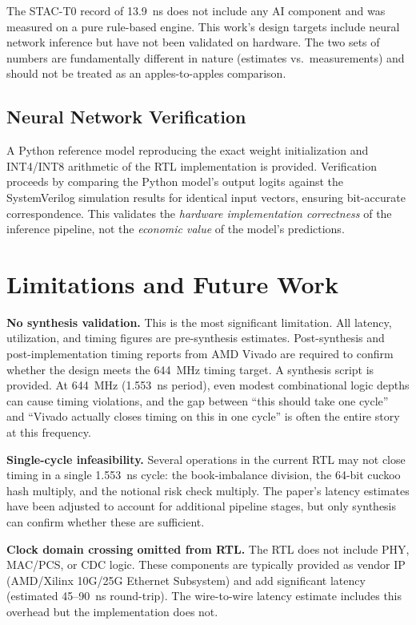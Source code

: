 \documentclass[conference,10pt]{IEEEtran}
\begin{document}
\noindent The STAC-T0 record of 13.9~ns does not include any AI component and was measured on a pure rule-based engine. This work's design targets include neural network inference but have not been validated on hardware. The two sets of numbers are fundamentally different in nature (estimates vs.\ measurements) and should not be treated as an apples-to-apples comparison.

\subsection{Neural Network Verification}

A Python reference model reproducing the exact weight initialization and INT4/INT8 arithmetic of the RTL implementation is provided. Verification proceeds by comparing the Python model's output logits against the SystemVerilog simulation results for identical input vectors, ensuring bit-accurate correspondence. This validates the \textit{hardware implementation correctness} of the inference pipeline, not the \textit{economic value} of the model's predictions.

\section{Limitations and Future Work}
\label{sec:limitations}

\textbf{No synthesis validation.} This is the most significant limitation. All latency, utilization, and timing figures are pre-synthesis estimates. Post-synthesis and post-implementation timing reports from AMD Vivado are required to confirm whether the design meets the 644~MHz timing target. A synthesis script is provided. At 644~MHz (1.553~ns period), even modest combinational logic depths can cause timing violations, and the gap between ``this should take one cycle'' and ``Vivado actually closes timing on this in one cycle'' is often the entire story at this frequency.

\textbf{Single-cycle infeasibility.} Several operations in the current RTL may not close timing in a single 1.553~ns cycle: the book-imbalance division, the 64-bit cuckoo hash multiply, and the notional risk check multiply. The paper's latency estimates have been adjusted to account for additional pipeline stages, but only synthesis can confirm whether these are sufficient.

\textbf{Clock domain crossing omitted from RTL.} The RTL does not include PHY, MAC/PCS, or CDC logic. These components are typically provided as vendor IP (AMD/Xilinx 10G/25G Ethernet Subsystem) and add significant latency (estimated 45--90~ns round-trip). The wire-to-wire latency estimate includes this overhead but the implementation does not.
\end{document}
